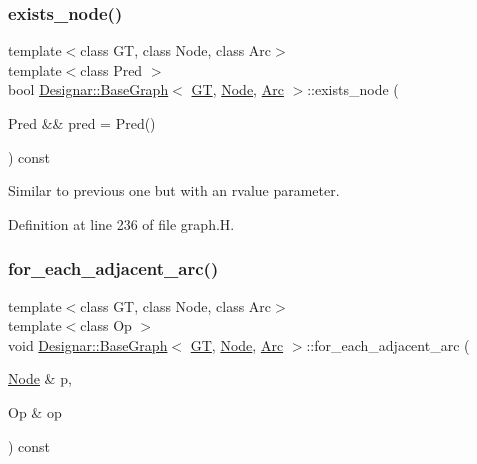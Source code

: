 \subsubsection{\texorpdfstring{exists\+\_\+node()}{exists\_node()}\hspace{0.1cm}{\footnotesize\ttfamily [2/2]}}
{\footnotesize\ttfamily template$<$class GT, class Node, class Arc$>$ \\
template$<$class Pred $>$ \\
bool \hyperlink{class_designar_1_1_base_graph}{Designar\+::\+Base\+Graph}$<$ \hyperlink{demo-buildgraph_8_c_a3001c40d2c31ca87ed96cd7d1334a55e}{GT}, \hyperlink{namespace_designar_a5af326c65aa2bd26b26c410f2030d09e}{Node}, \hyperlink{namespace_designar_a3f55fb5513d62ff47cbc8f72b8e95d6f}{Arc} $>$\+::exists\+\_\+node (\begin{DoxyParamCaption}\item[{Pred \&\&}]{pred = {\ttfamily Pred()} }\end{DoxyParamCaption}) const\hspace{0.3cm}{\ttfamily [inline]}}



Similar to previous one but with an rvalue parameter. 



Definition at line 236 of file graph.\+H.

\mbox{\label{class_designar_1_1_base_graph_a5e35c97bdf055f67e744f7d961ccb6a9}} 
\subsubsection{\texorpdfstring{for\+\_\+each\+\_\+adjacent\+\_\+arc()}{for\_each\_adjacent\_arc()}\hspace{0.1cm}{\footnotesize\ttfamily [1/2]}}
{\footnotesize\ttfamily template$<$class GT, class Node, class Arc$>$ \\
template$<$class Op $>$ \\
void \hyperlink{class_designar_1_1_base_graph}{Designar\+::\+Base\+Graph}$<$ \hyperlink{demo-buildgraph_8_c_a3001c40d2c31ca87ed96cd7d1334a55e}{GT}, \hyperlink{namespace_designar_a5af326c65aa2bd26b26c410f2030d09e}{Node}, \hyperlink{namespace_designar_a3f55fb5513d62ff47cbc8f72b8e95d6f}{Arc} $>$\+::for\+\_\+each\+\_\+adjacent\+\_\+arc (\begin{DoxyParamCaption}\item[{\hyperlink{namespace_designar_a5af326c65aa2bd26b26c410f2030d09e}{Node} \&}]{p,  }\item[{Op \&}]{op }\end{DoxyParamCaption}) const\hspace{0.3cm}{\ttfamily [inline]}}



